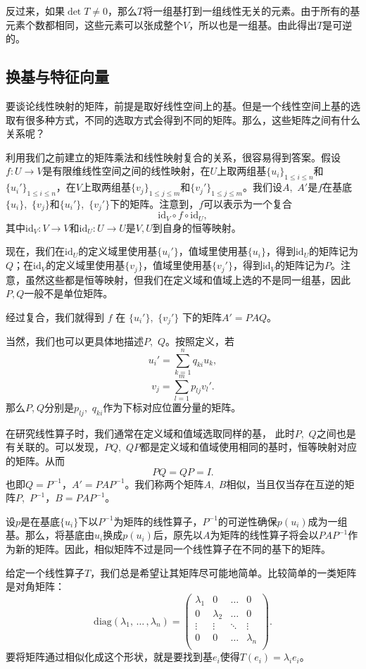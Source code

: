 反过来，如果$\det T\neq 0$，那么$T$将一组基打到一组线性无关的元素。由于所有的基元素个数都相同，这些元素可以张成整个$V$，所以也是一组基。由此得出$T$是可逆的。
\subsection{换基与特征向量}
要谈论线性映射的矩阵，前提是取好线性空间上的基。但是一个线性空间上基的选取有很多种方式，不同的选取方式会得到不同的矩阵。那么，这些矩阵之间有什么关系呢？

利用我们之前建立的矩阵乘法和线性映射复合的关系，很容易得到答案。假设$f:U\to V$是有限维线性空间之间的线性映射，在$U$上取两组基$\{u_i\}_{1\leqslant  i\leqslant  n}$和$\{u_i'\}_{1\leqslant  i\leqslant  n}$，在$V$上取两组基$\{v_j\}_{1\leqslant  j\leqslant  m}$和$\{v_j'\}_{1\leqslant  j\leqslant  m}$。我们设$A$,~$A'$是$f$在基底$\{u_i\}$,~$\{v_j\}$和$\{u_i'\}$,~$\{v_j'\}$下的矩阵。注意到，$f$可以表示为一个复合
\[\mathrm{id}_V\circ f\circ \mathrm{id}_U,\]
其中$\mathrm{id}_V:V\to V$和$\mathrm{id}_U:U\to U$是$V,U$到自身的恒等映射。

现在，我们在$\mathrm{id}_U$的定义域里使用基$\{u_i'\}$，值域里使用基$\{u_i\}$，得到$\mathrm{id}_U$的矩阵记为$Q$；在$\mathrm{id}_V$的定义域里使用基$\{v_j\}$，值域里使用基$\{v_j'\}$，得到$\mathrm{id}_V$的矩阵记为$P$。注意，虽然这些都是恒等映射，但我们在定义域和值域上选的不是同一组基，因此$P,Q$一般不是单位矩阵。

经过复合，我们就得到 $f$ 在 $\{u_i'\}$,~$\{v_j'\}$ 下的矩阵$A'=PAQ$。

当然，我们也可以更具体地描述$P$,~$Q$。按照定义，若
\[u_i'=\sum_{k=1}^nq_{ki}u_{k},\]
\[v_j=\sum_{l=1}^mp_{lj}v_l'.\]
那么$P$,$~Q$分别是$p_{lj}$,~$q_{ki}$作为下标对应位置分量的矩阵。

在研究线性算子时，我们通常在定义域和值域选取同样的基，
此时$P$,~$Q$之间也是有关联的。可以发现，$PQ$,~$QP$都是定义域和值域使用相同的基时，恒等映射对应的矩阵。从而
\[PQ=QP=I.\]
也即$Q=P^{-1}$，$A'=PAP^{-1}$。我们称两个矩阵$A$,~$B$相似，当且仅当存在互逆的矩阵$P$,~$P^{-1}$，$B=PAP^{-1}$。

设$p$是在基底$\{u_i\}$下以$P^{-1}$为矩阵的线性算子，$P^{-1}$的可逆性确保$p(u_i)$成为一组基。那么，将基底由$u_i$换成$p(u_i)$后，原先以$A$为矩阵的线性算子将会以$PAP^{-1}$作为新的矩阵。因此，相似矩阵不过是同一个线性算子在不同的基下的矩阵。

给定一个线性算子$T$，我们总是希望让其矩阵尽可能地简单。比较简单的一类矩阵是对角矩阵：
\[\mathrm{diag}(\lambda_1,\,\dots\,,\lambda_n)=\begin{pmatrix}
        \lambda_1 & 0         & \ldots & 0         \\
        0         & \lambda_2 & \ldots & 0         \\
        \vdots    & \vdots    & \ddots & \vdots    \\
        0         & 0         & \ldots & \lambda_n \\\end{pmatrix}.\]
要将矩阵通过相似化成这个形状，就是要找到基$e_i$使得$T(e_i)=\lambda_ie_i$。

